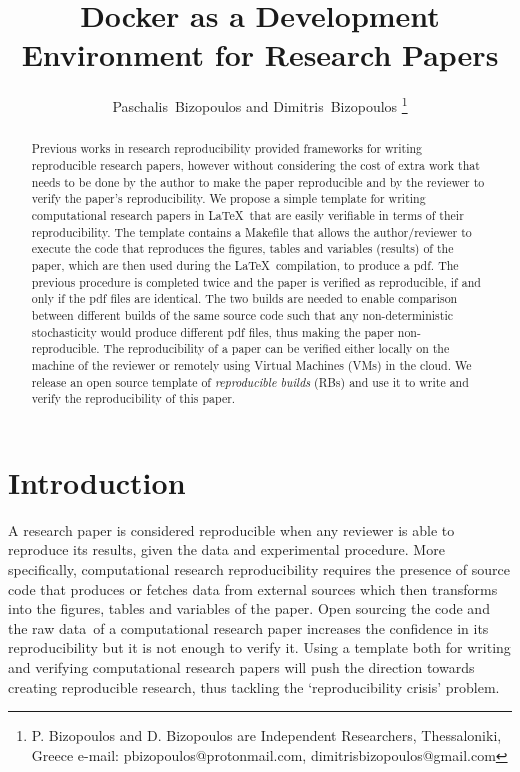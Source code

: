 \documentclass[journal]{IEEEtran}
\begin{document}

\title{Docker as a Development Environment for Research Papers}

\author{Paschalis~Bizopoulos and Dimitris~Bizopoulos
\thanks{P. Bizopoulos and D. Bizopoulos are Independent Researchers, Thessaloniki, Greece e-mail: pbizopoulos@protonmail.com, dimitrisbizopoulos@gmail.com}}

\maketitle

\begin{abstract}
	Previous works in research reproducibility provided frameworks for writing reproducible research papers, however without considering the cost of extra work that needs to be done by the author to make the paper reproducible and by the reviewer to verify the paper's reproducibility.
	We propose a simple template for writing computational research papers in \LaTeX\ that are easily verifiable in terms of their reproducibility.
	The template contains a Makefile that allows the author/reviewer to execute the code that reproduces the figures, tables and variables (results) of the paper, which are then used during the \LaTeX\ compilation, to produce a pdf.
	The previous procedure is completed twice and the paper is verified as reproducible, if and only if the pdf files are identical.
	The two builds are needed to enable comparison between different builds of the same source code such that any non-deterministic stochasticity would produce different pdf files, thus making the paper non-reproducible.
	The reproducibility of a paper can be verified either locally on the machine of the reviewer or remotely using Virtual Machines (VMs) in the cloud.
	We release an open source template of \textit{reproducible builds} (RBs) and use it to write and verify the reproducibility of this paper.
\end{abstract}

\section{Introduction}
A research paper is considered reproducible when any reviewer is able to reproduce its results, given the data and experimental procedure.
More specifically, computational research reproducibility requires the presence of source code that produces or fetches data from external sources which then transforms into the figures, tables and variables of the paper.
Open sourcing the code and the raw data of a computational research paper increases the confidence in its reproducibility but it is not enough to verify it.
Using a template both for writing and verifying computational research papers will push the direction towards creating reproducible research, thus tackling the `reproducibility crisis' problem.
\end{document}
